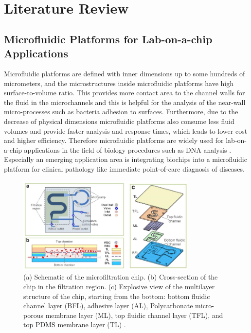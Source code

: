 \chapter{Literature Review}
\label{2}
\section{Microfluidic Platforms for Lab-on-a-chip Applications}
\label{2_1}
Microfluidic platforms are defined with inner dimensions up to some hundreds of micrometers, and the microstructures inside microfluidic platforms have high surface-to-volume ratio. This provides more contact area to the channel walls for the fluid in the microchannels and this is helpful for the analysis of the near-wall micro-processes such as bacteria adhesion to surfaces. Furthermore, due to the decrease of physical dimensions microfluidic platforms also consume less fluid volumes and provide faster analysis and response times, which leads to lower cost and higher efficiency. Therefore microfluidic platforms are widely used for lab-on-a-chip applications in the field of biology procedures such as DNA analysis \cite{burns1998integrated}. Especially an emerging application area is integrating biochips into a microfluidic platform for clinical pathology like immediate point-of-care diagnosis of diseases.

\begin{figure}[ht]%
\centering
\includegraphics[width=0.8\textwidth]{figures/literaturereview/figure2_1}%
\caption{(a) Schematic of the microfiltration chip. (b) Cross-section of the chip in the filtration region. (c) Explosive view of the multilayer structure of the chip, starting from the bottom: bottom fluidic channel layer (BFL), adhesive layer (AL), Polycarbonate micro-porous membrane layer (ML), top fluidic channel layer (TFL), and top PDMS membrane layer (TL) \cite{cheng2016high}.}%
\label{figure2_1}%
\end{figure}

